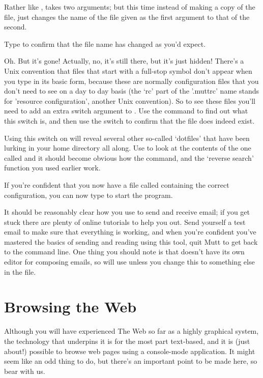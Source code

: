 Rather like ,  takes two arguments; but this time instead of making a copy of the file,  just changes the name of the file given as the first argument to that of the second. 

Type  to confirm that the file name has changed as you'd expect. 

Oh. But it's gone! Actually, no, it's still there, but it's just hidden! There's a Unix convention that files that start with a full-stop symbol don't appear when you type  in its basic form, because these are normally configuration files that you don't need to see on a day to day basis (the `rc' part of the '.muttrc' name stands for 'resource configuration', another Unix convention). So to see these files you'll need to add an extra switch argument to . Use the  command to find out what this switch is, and then use the switch to confirm that the  file does indeed exist. 

Using this switch on  will reveal several other so-called `dotfiles' that have been lurking in your home directory all along. Use  to look at the contents of the one called  and it should become obvious how the  command, and the `reverse search' function you used earlier work.

If you're confident that you now have a file called  containing the correct configuration, you can now type  to start the program. 

It should be reasonably clear how you use  to send and receive email; if you get stuck there are plenty of online tutorials to help you out. Send yourself a test email to make sure that everything is working, and when you're confident you've mastered the basics of sending and reading using this tool, quit Mutt to get back to the command line. One thing you should note is that  doesn't have its own editor for composing emails, so will use  unless you change this to something else in the  file. 

\section{Browsing the Web}

Although you will have experienced The Web so far as a highly graphical system, the technology that underpins it is for the most part text-based, and it is (just about!) possible to browse web pages using a console-mode application. It might seem like an odd thing to do, but there's an important point to be made here, so bear with us.

